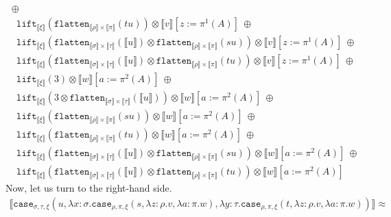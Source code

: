 \documentclass[runningheads,a4paper]{llncs}
\newcommand{\typeinterpret}[1]{\llbracket #1 \rrbracket}
\newcommand{\interpret}[1]{\llbracket #1 \rrbracket}
\newcommand{\abs}[2]{\lambda #1.#2}
\newcommand{\flatten}{\mathtt{flatten}}
\newcommand{\lift}{\mathtt{lift}}
\begin{document}
\begin{itemize}
\[\begin{array}{l}
    \ \oplus\\
  \phantom{A}
    \lift_{\typeinterpret{\xi}}(\flatten_{\typeinterpret{\rho} \times
    \typeinterpret{\pi}}(tu)) \otimes
     \interpret{v}[z:=\pi^1(A)]
    \ \oplus \\
  \phantom{A}
    \lift_{\typeinterpret{\xi}}(\flatten_{\typeinterpret{\sigma} \times
    \typeinterpret{\tau}}(\interpret{u}) \otimes
    \flatten_{\typeinterpret{\rho} \times \typeinterpret{\pi}}(su))
    \otimes
     \interpret{v}[z:=\pi^1(A)]
    \ \oplus \\
  \phantom{A}
    \lift_{\typeinterpret{\xi}}(\flatten_{\typeinterpret{\sigma} \times
    \typeinterpret{\tau}}(\interpret{u}) \otimes
    \flatten_{\typeinterpret{\rho} \times \typeinterpret{\pi}}(tu))
    \otimes
     \interpret{v}[z:=\pi^1(A)]
    \ \oplus \\
  \phantom{A}
    \lift_{\typeinterpret{\xi}}(3) \otimes \interpret{w}[a:=\pi^2(A)]
    \ \oplus \\
  \phantom{A}
    \lift_{\typeinterpret{\xi}}(3 \otimes
    \flatten_{\typeinterpret{\sigma} \times \typeinterpret{\tau}}(
    \interpret{u})) \otimes
    \interpret{w}[a:=\pi^2(A)]
    \ \oplus \\
  \phantom{A}
    \lift_{\typeinterpret{\xi}}(\flatten_{\typeinterpret{\rho} \times
    \typeinterpret{\pi}}(su)) \otimes
    \interpret{w}[a:=\pi^2(A)]
    \ \oplus\\
  \phantom{A}
    \lift_{\typeinterpret{\xi}}(\flatten_{\typeinterpret{\rho} \times
    \typeinterpret{\pi}}(tu)) \otimes
    \interpret{w}[a:=\pi^2(A)]
    \ \oplus \\
  \phantom{A}
    \lift_{\typeinterpret{\xi}}(\flatten_{\typeinterpret{\sigma} \times
    \typeinterpret{\tau}}(\interpret{u}) \otimes
    \flatten_{\typeinterpret{\rho} \times \typeinterpret{\pi}}(su))
    \otimes
    \interpret{w}[a:=\pi^2(A)]
    \ \oplus \\
  \phantom{A}
    \lift_{\typeinterpret{\xi}}(\flatten_{\typeinterpret{\sigma} \times
    \typeinterpret{\tau}}(\interpret{u}) \otimes
    \flatten_{\typeinterpret{\rho} \times \typeinterpret{\pi}}(tu))
    \otimes
    \interpret{w}[a:=\pi^2(A)]
  \end{array}
  \]
  Now, let us turn to the right-hand side.
  \[
  \begin{array}{l}
  \interpret{\mathtt{case}_{\sigma,\tau,\xi}(u,\abs{x:\sigma}{
  \mathtt{case}_{\rho,\pi,\xi}(s,\abs{z:\rho}{v},\abs{a:\pi}{w})},
  \abs{y:\tau}{\mathtt{case}_{\rho,\pi,\xi}(t,\abs{z:\rho}{v},\abs{a:
  \pi}{w})})} \approx \\

\end{array}\]
\end{itemize}
\end{document}
